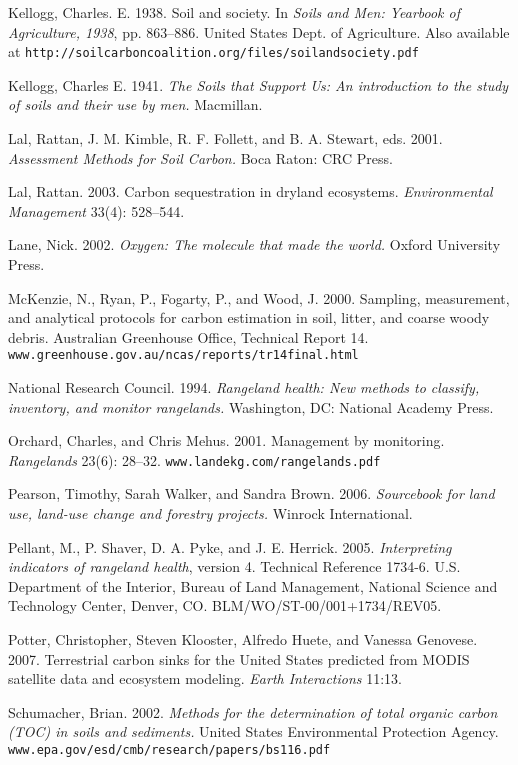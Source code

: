 \documentclass[11pt,letterpaper,oneside,onecolumn]{memoir}
\begin{document}
\begin{flushleft}
Kellogg, Charles. E. 1938. Soil and society. In \textit{Soils and Men: Yearbook of Agriculture, 1938}, pp. 863--886. United States Dept. of Agriculture. Also available at \texttt{http://soilcarboncoalition.org/files/soilandsociety.pdf}

Kellogg, Charles E. 1941. \textit{The Soils that Support Us: An introduction to the study of soils and their use by men.} Macmillan.

Lal, Rattan, J. M. Kimble, R. F. Follett, and B. A. Stewart, eds. 2001. \textit{Assessment Methods for Soil Carbon.} Boca Raton: CRC Press.

Lal, Rattan. 2003. Carbon sequestration in dryland ecosystems. \textit{Environmental Management} 33(4): 528--544.

Lane, Nick. 2002. \textit{Oxygen: The molecule that made the world.} Oxford University Press.

McKenzie, N., Ryan, P., Fogarty, P., and Wood, J. 2000. Sampling, measurement, and analytical protocols for carbon estimation in soil, litter, and coarse woody debris. Australian Greenhouse Office, Technical Report 14.\\ \texttt{www.greenhouse.gov.au/ncas/reports/tr14final.html}

National Research Council. 1994. \textit{Rangeland health: New methods to classify, inventory, and monitor rangelands.} Washington, DC: National Academy Press.

Orchard, Charles, and Chris Mehus. 2001. Management by monitoring. \textit{Rangelands} 23(6): 28--32. \texttt{www.landekg.com/rangelands.pdf}

Pearson, Timothy, Sarah Walker, and Sandra Brown. 2006. \textit{Sourcebook for land use, land-use change and forestry projects.} Winrock International.

Pellant, M., P. Shaver, D. A. Pyke, and J. E. Herrick. 2005. \textit{Interpreting indicators of rangeland health}, version 4. Technical Reference 1734-6. U.S. Department of the Interior, Bureau of Land Management, National Science and Technology Center, Denver, CO. BLM/WO/ST-00/001+1734/REV05.

Potter, Christopher, Steven Klooster, Alfredo Huete, and Vanessa Genovese. 2007. Terrestrial carbon sinks for the United States predicted from MODIS satellite data and ecosystem modeling. \textit{Earth Interactions} 11:13.

Schumacher, Brian. 2002. \textit{Methods for the determination of total organic carbon (TOC) in soils and sediments.} United States Environmental Protection Agency. \texttt{www.epa.gov/esd/cmb/research/papers/bs116.pdf}


\end{flushleft}
\end{document}
